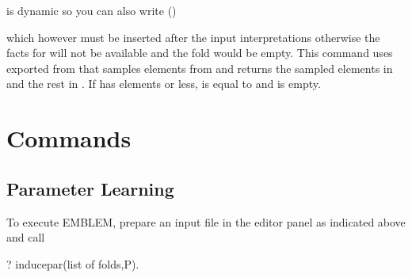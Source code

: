 \documentclass[letterpaper,10pt,english]{sphinxmanual}
\begin{document}
 is dynamic so you can also write ()

\begin{sphinxVerbatim}[commandchars=\\\{\}]
 
\end{sphinxVerbatim}

which however must be inserted after the input interpretations otherwise the facts for  will not be available and the fold  would be empty.
This command uses  exported from  that samples  elements from  and returns the sampled elements in  and the rest in .
If  has  elements or less,  is equal to  and  is empty.


\section{Commands}
\label{\detokenize{index:commands}}

\subsection{Parameter Learning}
\label{\detokenize{index:parameter-learning}}
To execute EMBLEM, prepare an input file in the editor panel as indicated above and call

\begin{sphinxVerbatim}[commandchars=\\\{\}]
?\PYGZhy{} induce\PYGZus{}par(\PYGZlt{}list of folds\PYGZgt{},P).
\end{sphinxVerbatim}
\end{document}

